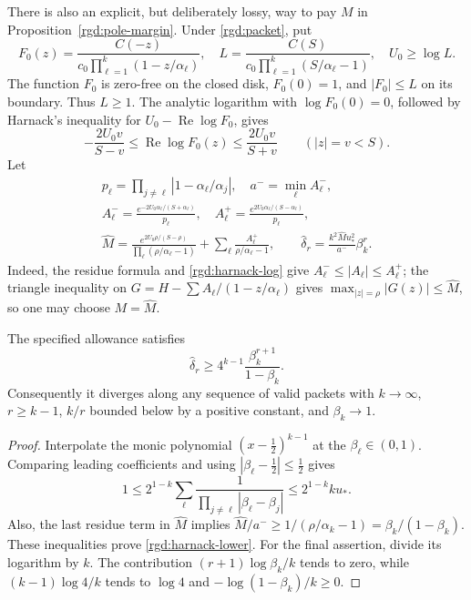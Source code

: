 There is also an explicit, but deliberately lossy, way to pay $M$ in
Proposition~\ref{rgd:pole-margin}.  Under \eqref{rgd:packet}, put
\[
 F_0(z)=\frac{C(-z)}{c_0\prod_{\ell=1}^k(1-z/\alpha_\ell)},
 \quad
 L=\frac{C(S)}{c_0\prod_{\ell=1}^k(S/\alpha_\ell-1)},
 \quad U_0\ge\log L.
\]
The function $F_0$ is zero-free on the closed disk, $F_0(0)=1$, and
$|F_0|\le L$ on its boundary.  Thus $L\ge1$.  The analytic logarithm
with $\log F_0(0)=0$, followed by Harnack's inequality for
$U_0-\operatorname{Re}\log F_0$, gives
\begin{equation}
 -\frac{2U_0v}{S-v}\le\operatorname{Re}\log F_0(z)
       \le\frac{2U_0v}{S+v}\qquad(|z|=v<S).
 \label{rgd:harnack-log}
\end{equation}
Let
\begin{gather*}
 p_\ell=\prod_{j\ne\ell}|1-\alpha_\ell/\alpha_j|,
 \quad a^-=\min_\ell A_\ell^-,\\
 A_\ell^-=\frac{e^{-2U_0\alpha_\ell/(S+\alpha_\ell)}}{p_\ell},
 \quad
 A_\ell^+=\frac{e^{2U_0\alpha_\ell/(S-\alpha_\ell)}}{p_\ell},
 \\
 \widehat M=\frac{e^{2U_0\rho/(S-\rho)}}
                      {\prod_\ell(\rho/\alpha_\ell-1)}
       +\sum_\ell\frac{A_\ell^+}{\rho/\alpha_\ell-1},
 \qquad
 \widehat\delta_r=\frac{k^2\widehat M u_*^2}{a^-}\beta_k^r.
\end{gather*}
Indeed, the residue formula and \eqref{rgd:harnack-log} give
$A_\ell^-\le|A_\ell|\le A_\ell^+$; the triangle inequality on
$G=H-\sum A_\ell/(1-z/\alpha_\ell)$ gives $\max_{|z|=\rho}|G(z)|\le\widehat M$, so one may choose
$M=\widehat M$.

\begin{proposition}
\label{rgd:harnack-stop}
The specified allowance satisfies
\begin{equation}
 \widehat\delta_r\ge
       4^{k-1}\frac{\beta_k^{r+1}}{1-\beta_k}.
 \label{rgd:harnack-lower}
\end{equation}
Consequently it diverges along any sequence of valid packets with
$k\to\infty$, $r\ge k-1$, $k/r$ bounded below by a positive constant,
and $\beta_k\to1$.
\end{proposition}
\begin{proof}
Interpolate the monic polynomial $(x-\tfrac12)^{k-1}$ at the
$\beta_\ell\in(0,1)$.  Comparing leading coefficients and using
$|\beta_\ell-\tfrac12|\le\tfrac12$ gives
\[
 1\le2^{1-k}\sum_\ell
       \frac1{\prod_{j\ne\ell}|\beta_\ell-\beta_j|}
    \le2^{1-k}ku_*.
\]
Also, the last residue term in $\widehat M$ implies
$\widehat M/a^-\ge1/(\rho/\alpha_k-1)=\beta_k/(1-\beta_k)$.
These inequalities prove \eqref{rgd:harnack-lower}.
For the final assertion, divide its logarithm by $k$.
The contribution $(r+1)\log\beta_k/k$ tends to zero, while
$(k-1)\log4/k$ tends to $\log4$ and
$-\log(1-\beta_k)/k\ge0$.
\end{proof}

